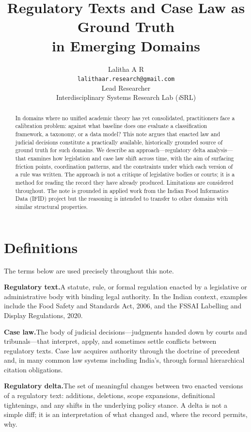 \documentclass[12pt,a4paper]{article}
\title{Regulatory Texts and Case Law as Ground Truth\\ in Emerging Domains}
\author{Lalitha A R\\
\texttt{lalithaar.research@gmail.com}\\
Lead Researcher\\
Interdisciplinary Systems Research Lab (\textit{i}SRL)}
\begin{document}
\maketitle


\begin{abstract}
\noindent
\normalsize
In domains where no unified academic theory has yet consolidated, practitioners
face a calibration problem: against what baseline does one evaluate a classification
framework, a taxonomy, or a data model? This note argues that enacted law and
judicial decisions constitute a practically available, historically grounded source
of ground truth for such domains. We describe an approach---regulatory delta
analysis---that examines how legislation and case law shift across time, with the
aim of surfacing friction points, coordination patterns, and the constraints under
which each version of a rule was written. The approach is not a critique of
legislative bodies or courts; it is a method for reading the record they have
already produced. Limitations are considered throughout. The note is grounded in
applied work from the Indian Food Informatics Data (IFID) project but the
reasoning is intended to transfer to other domains with similar structural
properties.
\end{abstract}


\newpage
\section{Definitions}

The terms below are used precisely throughout this note.

\textbf{Regulatory text.}\enskip A statute, rule, or formal regulation enacted by a
legislative or administrative body with binding legal authority. In the Indian
context, examples include the Food Safety and Standards Act, 2006, and the FSSAI
Labelling and Display Regulations, 2020.

\medskip
\textbf{Case law.}\enskip The body of judicial decisions---judgments handed down by
courts and tribunals---that interpret, apply, and sometimes settle conflicts
between regulatory texts. Case law acquires authority through the doctrine of
precedent and, in many common law systems including India's, through formal
hierarchical citation obligations.

\medskip
\textbf{Regulatory delta.}\enskip The set of meaningful changes between two enacted
versions of a regulatory text: additions, deletions, scope expansions,
definitional tightenings, and any shifts in the underlying policy stance. A delta
is not a simple diff; it is an interpretation of what changed and, where the
record permits, why.
\end{document}
